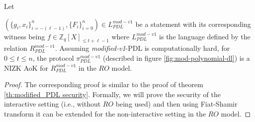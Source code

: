 \begin{theorem}\label{th:modified_v1_PDL security}
  Let\par $(\{g_i,x_i\}_{i=-(\ell-1)}^n,\{F_i\}_{i=0}^n)\in L_{PDL}^{mod-v1}$ be a statement 
  with its corresponding witness being $f\in\mathbb{Z}_q[X]_{\leq t+\ell-1}$ where $L_{PDL}^{mod-v1}$ is the 
  language defined by the relation $R_{PDL}^{mod-v1}$. Assuming \textit{modified-v1}-PDL is computationally hard, for 
  $0\leq t\leq n$, the protocol $\pi_{PDL}^{mod-v1}$ (described in figure \ref{fig:mod-polynomial-dl}) is a 
  NIZK AoK for $R_{PDL}^{mod-v1}$ in  the $RO$ model.
\end{theorem}
\begin{proof}
  The corresponding proof is similar to the proof of theorem \ref{th:modified_PDL security}. 
  Formally, we will prove the security of the interactive setting (i.e., without $RO$ being used) and then 
  using Fiat-Shamir transform it can be extended for the non-interactive setting in the $RO$ model. 


\end{proof}
